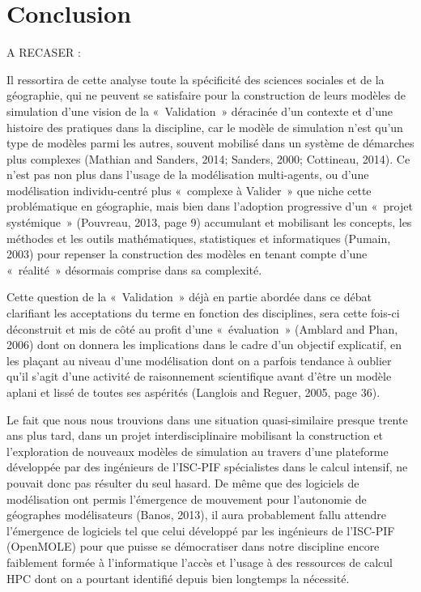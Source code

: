 \graphicspath{{Conclusion/}}

\chapter{Conclusion}

\startcontents[chapters]
\Mprintcontents
A RECASER : 

Il ressortira de cette analyse toute la spécificité des sciences sociales et de la géographie, qui ne peuvent se satisfaire pour la construction de leurs modèles de simulation d'une vision de la « Validation » déracinée d'un contexte et d'une histoire des pratiques dans la discipline, car le modèle de simulation n'est qu'un type de modèles parmi les autres, souvent mobilisé dans un système de démarches plus complexes (Mathian and Sanders, 2014; Sanders, 2000; Cottineau, 2014)⁠. Ce n'est pas non plus dans l'usage de la modélisation multi-agents, ou d'une modélisation individu-centré plus « complexe à Valider » que niche cette problématique en géographie, mais bien dans l'adoption progressive d'un « projet systémique » (Pouvreau, 2013, page 9)⁠ accumulant et mobilisant les concepts, les méthodes et les outils mathématiques, statistiques et informatiques (Pumain, 2003)⁠ pour repenser la construction des modèles en tenant compte d'une « réalité » désormais comprise dans sa complexité. 

Cette question de la « Validation » déjà en partie abordée dans ce débat clarifiant les acceptations du terme en fonction des disciplines, sera cette fois-ci déconstruit et mis de côté au profit d'une « évaluation »  (Amblard and Phan, 2006)⁠ dont on donnera les implications dans le cadre d'un objectif explicatif, en les plaçant au niveau d'une modélisation dont on a parfois tendance à oublier qu'il s'agit d'une activité de raisonnement scientifique avant d'être un modèle aplani et lissé de toutes ses aspérités (Langlois and Reguer, 2005, page 36)⁠.  

Le fait que nous nous trouvions dans une situation quasi-similaire presque trente ans plus tard, dans un projet interdisciplinaire mobilisant la construction et l'exploration de nouveaux modèles de simulation au travers d'une plateforme développée par des ingénieurs de l'ISC-PIF spécialistes dans le calcul intensif, ne pouvait donc pas résulter du seul hasard. De même que des logiciels de modélisation ont permis l'émergence de mouvement pour l'autonomie de géographes modélisateurs (Banos, 2013)⁠, il aura probablement fallu attendre l'émergence de logiciels tel que celui développé par les ingénieurs de l'ISC-PIF (OpenMOLE) pour que puisse se démocratiser dans notre discipline encore faiblement formée à l'informatique l'accès et l'usage à des ressources de calcul HPC dont on a pourtant identifié depuis bien longtemps la nécessité. 

